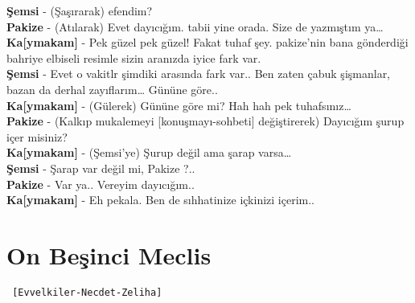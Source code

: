 \documentclass[]{book}
\begin{document}
\textbf{Şemsi} - (Şaşırarak) efendim?\\
\textbf{Pakize} - (Atılarak) Evet dayıcığım. tabii yine orada. Size de yazmıştım ya\ldots{}\\
\textbf{Ka{[}ymakam{]}} - Pek güzel pek güzel! Fakat tuhaf şey. pakize'nin bana gönderdiği bahriye elbiseli resimle sizin aranızda iyice fark var.\\
\textbf{Şemsi} - Evet o vakitlr şimdiki arasında fark var.. Ben zaten çabuk şişmanlar, bazan da derhal zayıflarım\ldots{} Gününe göre..\\
\textbf{Ka{[}ymakam{]}} - (Gülerek) Gününe göre mi? Hah hah pek tuhafsınız\ldots{}\\
\textbf{Pakize} - (Kalkıp mukalemeyi {[}konuşmayı-sohbeti{]} değiştirerek) Dayıcığım şurup içer misiniz?\\
\textbf{Ka{[}ymakam{]}} - (Şemsi'ye) Şurup değil ama şarap varsa\ldots{}\\
\textbf{Şemsi} - Şarap var değil mi, Pakize ?..\\
\textbf{Pakize} - Var ya.. Vereyim dayıcığım..\\
\textbf{Ka{[}ymakam{]}} - Eh pekala. Ben de sıhhatinize içkinizi içerim..\\

\hypertarget{on-besinci-meclis}{%
\section{On Beşinci Meclis}\label{on-besinci-meclis}}

\begin{verbatim}
 [Evvelkiler-Necdet-Zeliha]
\end{verbatim}
\end{document}
